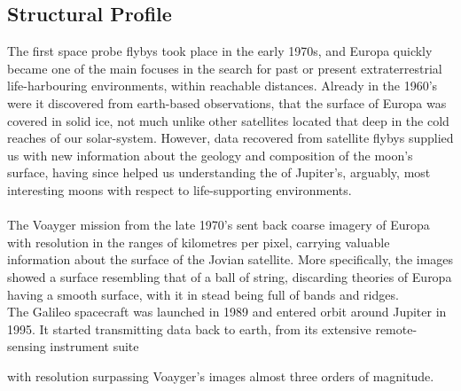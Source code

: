 \subsection{Structural Profile}
The first space probe flybys took place in the early 1970s, and Europa quickly became one of the main focuses in the search for past or present extraterrestrial life-harbouring environments, within reachable distances. Already in the 1960's were it discovered from earth-based observations, that the surface of Europa was covered in solid ice, not much unlike other satellites located that deep in the cold reaches of our solar-system. However, data recovered from satellite flybys supplied us with new information about the geology and composition of the moon's surface, having since helped us understanding the of Jupiter's, arguably, most interesting moons with respect to life-supporting environments.\\
\\
The Voayger mission from the late 1970's sent back coarse imagery of Europa with resolution in the ranges of kilometres per pixel, carrying valuable information about the surface of the Jovian satellite\cite{VoyagImg}. More specifically, the images showed a surface resembling that of a ball of string, discarding theories of Europa having a smooth surface, with it in stead being full of bands and ridges.\\%
The Galileo spacecraft was launched in 1989 and entered orbit around Jupiter in 1995. It started transmitting data back to earth, from its extensive remote-sensing instrument suite

 with resolution surpassing Voayger's images almost three orders of magnitude. 
\iffalse
